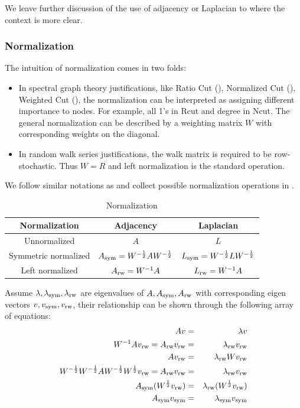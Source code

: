 We leave further discussion of the use of adjacency or Laplacian 
to \rsec{\ref{sec:justification}} where the context is more clear. 

\subsubsection{Normalization}

The intuition of normalization comes in two folds:
\begin{itemize}
	\item In spectral graph theory justifications, like 
	Ratio Cut (\rsec{\ref{sec:rcut}}), 
	Normalized Cut (\rsec{\ref{sec:ncut}}), 
	Weighted Cut (\rsec{\ref{sec:wcut}}), 
	the normalization can be interpreted as assigning 
	different importance to nodes. For example, 
	all 1's in Rcut and degree in Ncut. The general normalization 
	can be described by a weighting matrix $W$ with corresponding 
	weights on the diagonal. 
	\item In random walk series justifications, the walk matrix 
	is required to be row-stochastic. Thus $W=R$ and left 
	normalization is the standard operation. 
\end{itemize}

We follow similar notations as \cite{von2007tutorial} and 
collect possible normalization operations in \rtbl{\ref{tbl:normalization}}. 

\begin{table}[htb]
	\label{tbl:normalization}
	\centering
	\caption{Normalization}
	\begin{tabular}{c|c|c}
		\hline
		Normalization & Adjacency & Laplacian \\
		\hline
		Unnormalized & $A$ & $L$ \\
		Symmetric normalized & $A_{\text{sym}}=W^{-\frac{1}{2}}AW^{-\frac{1}{2}}$ 
			& $L_{\text{sym}}=W^{-\frac{1}{2}}LW^{-\frac{1}{2}}$ \\
		Left normalized & $A_{\text{rw}}=W^{-1}A$ & $L_{\text{rw}}=W^{-1}A$\\
		\hline
	\end{tabular}
\end{table}

Assume $ \lambda, \lambda_{\text{sym}}, \lambda_{\text{rw}} $ are eigenvalues
of $ A, A_{\text{sym}}, A_{\text{rw}} $ with corresponding eigen vectors 
$ v, v_{\text{sym}}, v_{\text{rw}} $, their relationship can be shown through 
the following array of equations:
\begin{eqnarray}
	Av &=& \lambda v \label{eq:eiga}\\
	W^{-1} A v_{\text{rw}} = A_{\text{rw}} v_{\text{rw}} &=& \lambda_{\text{rw}} v_{\text{rw}} \\
	A v_{\text{rw}} &=& \lambda_{\text{rw}} Wv_{\text{rw}} \label{eq:eigarw1}\\
	W^{-\frac{1}{2}} W^{-\frac{1}{2}} A 
	W^{-\frac{1}{2}} W^{\frac{1}{2}} v_{\text{rw}}
	= A_{\text{rw}} v_{\text{rw}} 
	&=& \lambda_{\text{rw}} v_{\text{rw}} \\
	A_{\text{sym}}(W^{\frac{1}{2}} v_{\text{rw}}) &=& 
	\lambda_{\text{rw}}(W^{\frac{1}{2}} v_{\text{rw}}) \label{eq:eigarw2}\\
	A_{\text{sym}} v_{\text{sym}} &=& \lambda_{\text{sym}} v_{\text{sym}} \label{eq:eigasym}
\end{eqnarray}

